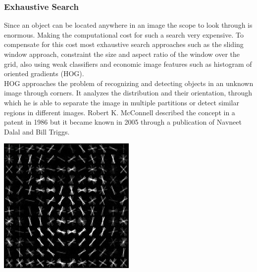 \subsubsection{Exhaustive Search}
Since an object can be located anywhere in an image the scope to look through is enormous. Making the computational cost for such a search very
expensive. To compensate for this cost most exhaustive search approaches such as the sliding window approach, constraint the size and aspect
ratio of the window over the grid, also using weak classifiers and economic image features such as histogram of oriented gradients
(HOG).\cite{selectivesearch} \\
HOG approaches the problem of recognizing and detecting objects in an unknown image through corners. It analyzes the distribution and their
orientation, through which he is able to separate the image in multiple partitions or detect similar regions in different images.
Robert K. McConnell described the concept in a patent in 1986 but it became known in 2005 through a publication of Navneet Dalal and Bill
Triggs.\cite{wiki_hog}
\vspace{0.5cm}
\begin{center}
    \includegraphics[width=0.5\textwidth]{images/Dlib_Learned-HOG-Detector.jpg} \cite{wiki_hog}
\end{center}

